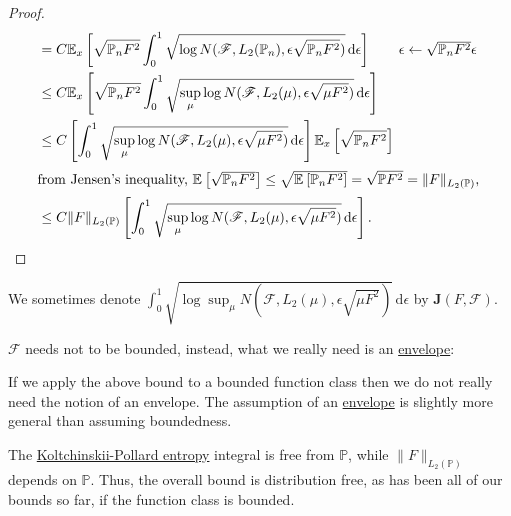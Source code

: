 \begin{proof}
\begin{align*}
		 & = C \mathbb{E}_{x}\left[ \sqrt{\mathbb{P} _n F^2} \int_{0}^{1} \sqrt{\log N(\mathscr{F} , L_2(\mathbb{P} _n), \epsilon \sqrt{\mathbb{P} _n F^2} )} \,\mathrm{d}\epsilon \right]  \tag*{\(\epsilon \gets \sqrt{\mathbb{P} _n F^2} \epsilon  \) }                                                                                                          \\
		 & \leq C \mathbb{E}_{x}\left[\sqrt{\mathbb{P} _n F^2} \int_{0}^{1} \sqrt{\sup _\mu \log N(\mathscr{F} , L_2(\mu ), \epsilon \sqrt{\mu F^2} )} \,\mathrm{d}\epsilon \right]                                                                                                                                                                                 \\
		 & \leq C \left[ \int_{0}^{1} \sqrt{\sup _\mu \log N(\mathscr{F} , L_2(\mu ), \epsilon \sqrt{\mu F^2} )} \,\mathrm{d}\epsilon \right] \mathbb{E}_{x}\left[\sqrt{\mathbb{P} _n F^2}  \right]                                                                                                                                                                 \\
		\shortintertext{from Jensen's inequality, \(\mathbb{E}_{}\left[\sqrt{\mathbb{P} _n F^2} \right] \leq \sqrt{\mathbb{E}_{}\left[\mathbb{P} _n F^2 \right] } = \sqrt{\mathbb{P} F^2} = \lVert F \rVert _{L_2(\mathbb{P} )}\),}
		 & \leq C \lVert F \rVert _{L_2(\mathbb{P} )} \left[ \int_{0}^{1} \sqrt{\sup _\mu \log N(\mathscr{F} , L_2(\mu ), \epsilon \sqrt{\mu F^2} )} \,\mathrm{d}\epsilon \right] .
	\end{align*}
\end{proof}

\begin{notation}
	We sometimes denote \(\displaystyle \int_{0}^{1} \sqrt{\log \sup _\mu N(\mathscr{F} , L_2(\mu ), \epsilon \sqrt{\mu F^2} )}  \,\mathrm{d}\epsilon \) by \(\bm{J} (F, \mathscr{F} )\).
\end{notation}

\(\mathscr{F} \) needs not to be bounded, instead, what we really need is an \hyperref[def:envelope]{envelope}:
\begin{remark}
	If we apply the above bound to a bounded function class then we do not really need the notion of an envelope. The assumption of an \hyperref[def:envelope]{envelope} is slightly more general than assuming boundedness.
\end{remark}

\begin{remark}
	The \hyperref[def:Koltchinskii-Pollard-entropy]{Koltchinskii-Pollard entropy} integral is free from \(\mathbb{P} \), while \(\lVert F \rVert _{L_2(\mathbb{P} )}\) depends on \(\mathbb{P} \). Thus, the overall bound is distribution free, as has been all of our bounds so far, if the function class is bounded.
\end{remark}

